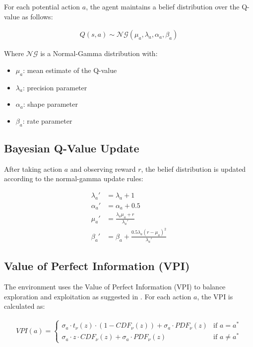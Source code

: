 For each potential action $a$, the agent maintains a belief distribution over the Q-value as follows:

\begin{align}
    Q(s, a) \sim \mathcal{NG}(\mu_{a}, \lambda_{a}, \alpha_{a}, \beta_{a})
\end{align}

Where $\mathcal{NG}$ is a Normal-Gamma distribution with:
\begin{itemize}
    \item $\mu_{a}$: mean estimate of the Q-value
    \item $\lambda_{a}$: precision parameter
    \item $\alpha_{a}$: shape parameter
    \item $\beta_{a}$: rate parameter
\end{itemize}

\subsection{Bayesian Q-Value Update}

After taking action $a$ and observing reward $r$, the belief distribution is updated according to the normal-gamma update rules:

\begin{align}
\lambda_{a}' &= \lambda_{a} + 1\\
\alpha_{a}' &= \alpha_{a} + 0.5\\
\mu_{a}' &= \frac{\lambda_{a} \mu_{a} + r}{\lambda_{a}'}\\
\beta_{a}' &= \beta_{a} + \frac{0.5 \lambda_{a} (r - \mu_{a})^2}{\lambda_{a}'}
\end{align}

\subsection{Value of Perfect Information (VPI)}
The environment uses the Value of Perfect Information (VPI) to balance exploration and exploitation as suggested in \cite{matthews2012}. For each action $a$, the VPI is calculated as:

\begin{align}
VPI(a) = \begin{cases}
\sigma_a \cdot t_{\nu}(z) \cdot (1 - CDF_{\nu}(z)) + \sigma_a \cdot PDF_{\nu}(z) & \text{if } a = a^*\\
\sigma_a \cdot z \cdot CDF_{\nu}(z) + \sigma_a \cdot PDF_{\nu}(z) & \text{if } a \neq a^*
\end{cases}
\end{align}

